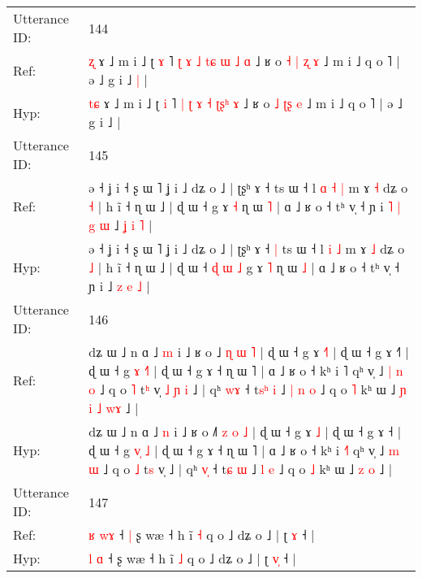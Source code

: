 \documentclass[10pt]{article}
\DeclareRobustCommand{\hl}[1]{{\textcolor{red}{#1}}}
\begin{document}
\begin{longtable}{ll}
 \\
\midrule
Utterance ID: & 144 \\
Ref: & \hl{}\hl{ʐ} ɤ ˩ m i ˩ ʈ \hl{ɤ} ˥ \hl{ʈ} \hl{ɤ} \hl{˩} \hl{t}\hl{ɕ} \hl{ɯ}\hl{ }\hl{˩} \hl{ɑ} ˩ ʁ o \hl{˧} \hl{|}\hl{ }\hl{ʐ} \hl{ɤ} ˩ m i ˩ q o ˥ | ə ˩ g i ˩\hl{ }\hl{|} |
 \\
Hyp: & \hl{t}\hl{ɕ} ɤ ˩ m i ˩ ʈ \hl{i} ˥ \hl{|} \hl{ʈ} \hl{ɤ} \hl{}\hl{˧} \hl{ʈ}\hl{ʂ}\hl{ʰ} \hl{ɤ} ˩ ʁ o \hl{˩} \hl{}\hl{ʈ}\hl{ʂ} \hl{e} ˩ m i ˩ q o ˥ | ə ˩ g i ˩\hl{}\hl{} |
 \\
\midrule
Utterance ID: & 145 \\
Ref: & ə ˧ ʝ i ˧ ʂ ɯ ˥ ʝ i ˩ dʑ o ˩ | ʈʂʰ ɤ ˧\hl{}\hl{} ts ɯ ˧ l\hl{ }\hl{ɑ} \hl{˧} \hl{|} m ɤ \hl{˧} dʑ o \hl{˧} | h ĩ ˧ ɳ ɯ ˩ | ɖ ɯ ˧\hl{}\hl{}\hl{}\hl{}\hl{}\hl{} g ɤ \hl{˧} ɳ ɯ \hl{˥} | ɑ ˩ ʁ o ˧ tʰ v̩ ˧ ɲ i\hl{ }\hl{˥}\hl{ }\hl{|}\hl{ }\hl{g}\hl{ }\hl{ɯ} ˩ \hl{ʝ} \hl{i} \hl{˥} |
 \\
Hyp: & ə ˧ ʝ i ˧ ʂ ɯ ˥ ʝ i ˩ dʑ o ˩ | ʈʂʰ ɤ ˧\hl{ }\hl{|} ts ɯ ˧ l\hl{}\hl{} \hl{i} \hl{˩} m ɤ \hl{˩} dʑ o \hl{˩} | h ĩ ˧ ɳ ɯ ˩ | ɖ ɯ ˧\hl{ }\hl{ɖ}\hl{ }\hl{ɯ}\hl{ }\hl{˩} g ɤ \hl{˥} ɳ ɯ \hl{˩} | ɑ ˩ ʁ o ˧ tʰ v̩ ˧ ɲ i\hl{}\hl{}\hl{}\hl{}\hl{}\hl{}\hl{}\hl{} ˩ \hl{z} \hl{e} \hl{˩} |
 \\
\midrule
Utterance ID: & 146 \\
Ref: & dʑ ɯ ˩ n ɑ ˩ \hl{m} i ˩ ʁ o ˩\hl{} \hl{ɳ} \hl{ɯ} \hl{˥} | ɖ ɯ ˧ g ɤ \hl{˧}\hl{˥} | ɖ ɯ ˧ g ɤ ˧\hl{˥} | ɖ ɯ ˧ g \hl{ɤ}\hl{ }\hl{˧}\hl{˥} | ɖ ɯ ˧ g ɤ ˧ ɳ ɯ ˥ | ɑ ˩ ʁ o ˧ kʰ i \hl{}˥ qʰ v̩ ˩\hl{ }\hl{|} \hl{n} \hl{o} ˩ q o \hl{˥} t\hl{ʰ} v̩\hl{ }\hl{˩}\hl{ }\hl{ɲ}\hl{ }\hl{i} ˩ | qʰ \hl{w}\hl{ɤ} ˧ t\hl{s}\hl{ʰ} \hl{i} ˩\hl{ }\hl{|} \hl{n} \hl{o} ˩ q o \hl{˥} kʰ ɯ ˩\hl{ }\hl{ɲ}\hl{ }\hl{i} \hl{˩} \hl{w}\hl{ɤ} ˩ |
 \\
Hyp: & dʑ ɯ ˩ n ɑ ˩ \hl{n} i ˩ ʁ o ˩\hl{˥} \hl{z} \hl{o} \hl{˩} | ɖ ɯ ˧ g ɤ \hl{}\hl{˩} | ɖ ɯ ˧ g ɤ ˧\hl{} | ɖ ɯ ˧ g \hl{v}\hl{̩}\hl{ }\hl{˩} | ɖ ɯ ˧ g ɤ ˧ ɳ ɯ ˥ | ɑ ˩ ʁ o ˧ kʰ i \hl{˧}˥ qʰ v̩ ˩\hl{}\hl{} \hl{m} \hl{ɯ} ˩ q o \hl{˩} t\hl{s} v̩\hl{}\hl{}\hl{}\hl{}\hl{}\hl{} ˩ | qʰ \hl{v}\hl{̩} ˧ t\hl{}\hl{ɕ} \hl{ɯ} ˩\hl{}\hl{} \hl{l} \hl{e} ˩ q o \hl{˩} kʰ ɯ ˩\hl{}\hl{}\hl{}\hl{} \hl{z} \hl{}\hl{o} ˩ |
 \\
\midrule
Utterance ID: & 147 \\
Ref: & \hl{ʁ} \hl{w}\hl{ɤ} ˧\hl{ }\hl{|} ʂ wæ ˧ h ĩ \hl{˧} q o ˩ dʑ o ˩ | ʈ \hl{}\hl{ɤ} ˧ |
 \\
Hyp: & \hl{l} \hl{}\hl{ɑ} ˧\hl{}\hl{} ʂ wæ ˧ h ĩ \hl{˩} q o ˩ dʑ o ˩ | ʈ \hl{v}\hl{̩} ˧ |
 \\

\end{longtable}
\end{document}
